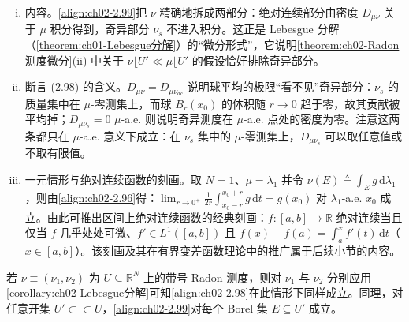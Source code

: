 \documentclass[../../main.tex]{subfiles}%
\begin{document}
\begin{remark}\label{remark:ch02-Lebesgue分解}
\begin{enumerate}[(i)]
\item 内容。\eqref{align:ch02-2.99}把 $\nu$ 精确地拆成两部分：绝对连续部分由密度 $D_{\mu\nu}$ 关于 $\mu$ 积分得到，奇异部分 $\nu_s$ 不进入积分。这正是 Lebesgue 分解（\cref{theorem:ch01-Lebesgue分解}）的“微分形式”，它说明\cref{theorem:ch02-Radon测度微分}(ii) 中关于 $\nu\lfloor U'\ll\mu\lfloor U'$ 的假设恰好排除奇异部分。
\item 断言 (2.98) 的含义。$D_{\mu\nu}=D_{\mu\nu_{ac}}$ 说明球平均的极限“看不见”奇异部分：$\nu_s$ 的质量集中在 $\mu$-零测集上，而球 $B_r(x_0)$ 的体积随 $r\to0$ 趋于零，故其贡献被平均掉；$D_{\mu\nu_s}=0$ $\mu$-a.e. 则说明奇异测度在 $\mu$-a.e. 点处的密度为零。注意这两条都只在 $\mu$-a.e. 意义下成立：在 $\nu_s$ 集中的 $\mu$-零测集上，$D_{\mu\nu_s}$ 可以取任意值或不取有限值。
\item 一元情形与绝对连续函数的刻画。取 $N=1$、$\mu=\lambda_1$ 并令 $\nu(E)\triangleq\int_Eg\,\mathrm{d}\lambda_1$，则由\eqref{align:ch02-2.96}得：$\lim_{r\to0^+}\frac{1}{2r}\int_{x_0-r}^{x_0+r}g\,\mathrm{d}t=g(x_0)$ 对 $\lambda_1$-a.e. $x_0$ 成立。由此可推出区间上绝对连续函数的经典刻画：$f:[a,b]\to\mathbb R$ 绝对连续当且仅当 $f$ 几乎处处可微、$f'\in L^1([a,b])$ 且 $f(x)-f(a)=\int_a^xf'(t)\,\mathrm{d}t$（$x\in[a,b]$）。该刻画及其在有界变差函数理论中的推广属于后续小节的内容。
\end{enumerate}
\end{remark}

\begin{remark}\label{remark:ch02-RN带号微分}
若 $\nu\equiv(\nu_1,\nu_2)$ 为 $U\subseteq\mathbb R^N$ 上的带号 Radon 测度，则对 $\nu_1$ 与 $\nu_2$ 分别应用\cref{corollary:ch02-Lebesgue分解}可知\eqref{align:ch02-2.98}在此情形下同样成立。同理，对任意开集 $U'\subset\subset U$，\eqref{align:ch02-2.99}对每个 Borel 集 $E\subseteq U'$ 成立。
\end{remark}
\end{document}
